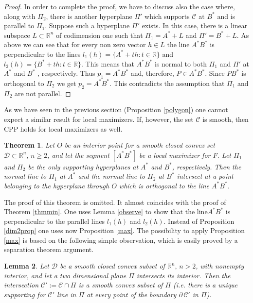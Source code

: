 \documentclass[a4paper,12pt]{amsart}
\newtheorem{thm}{Theorem}
\newtheorem{lemma}[thm]{Lemma}
\begin{document}
\begin{proof}
 In order to complete the proof, we have to discuss also the case where, along with $\Pi_2$,  there is another hyperplane $\Pi'$
 which supports $\mathcal C$ at $B^*$ and is parallel to $\Pi_1$.
 Suppose such a hyperplane $\Pi'$ exists. In this case, there is a linear subspace $L \subset \mathbb R^n$ of codimension one such that $\Pi_1 = A^* + L$ and $\Pi' = B^* + L$.
As above we can see that for every non zero vector $h \in L$ the
line $A^*B^*$ is perpendicular to the lines $l_1(h)=\{A^* + th: t
\in \mathbb{R}\}$ and $l_2(h)=\{B^* + th: t \in \mathbb{R}\}$.
This means that $A^*B^*$ is normal to both $\Pi_1$ and $\Pi'$ at
$A^*$ and $B^*$ , respectively. Thus $p_1 = A^*B^* $ and,
therefore, $P \in A^*B^*$. Since $PB^*$ is orthogonal to $\Pi_2$
we get $p_2 = A^*B^*$. This contradicts the assumption that
$\Pi_1$ and $\Pi_2$ are not parallel.
 \end{proof}

 As we have seen in the previous section (Proposition \ref{polygon}) one cannot expect a similar result for local maximizers.
 If, however, the set $\mathcal C$ is smooth, then CPP holds for local maximizers as well.
 \begin{thm}
 Let $O$ be an interior point for a smooth closed convex set $\mathcal D \subset \mathbb{R}^n,\, n \geq 2$, and let
 the segment $[A^*B^*]$ be a local maximizer for $F$. Let $\Pi_1$ and $\Pi_2$ be the only supporting hyperplanes at $A^*$ and $B^*$, respectively. Then
the normal line to $\Pi_1$ at $A^*$ and the normal line to $\Pi_2$
at $B^*$ intersect at a point belonging to the hyperplane through $O$ which
is orthogonal to the line $A^*B^*$.
 \end{thm}
The proof of this theorem is omitted. It almost coincides with the proof of Theorem \ref{thmmin}. One uses Lemma \ref{observe}
to show that the line$A^*B^*$ is perpendicular to the parallel lines $l_1(h)$ and $l_2(h)$. Instead of  Proposition \ref{dim2prop} one uses now Proposition \ref{max}. The possibility to apply Proposition \ref{max} is based on the following simple observation, which is easily proved by a separation theorem argument.

\begin{lemma} \label{relative}
Let $\mathcal D$ be a smooth closed convex subset of
$\mathbb{R}^n,\, n > 2$, with nonempty interior, and let a two
dimensional plane $\Pi$ intersects its interior. Then the
intersection $\mathcal C':=\mathcal C \cap \Pi$ is a smooth convex
subset of $\Pi$ (i.e. there is a unique supporting for $\mathcal
C'$ line  in $\Pi$ at every point of the boundary $\partial \,
\mathcal C'$ in  $\Pi$).
\end{lemma}
\end{document}
